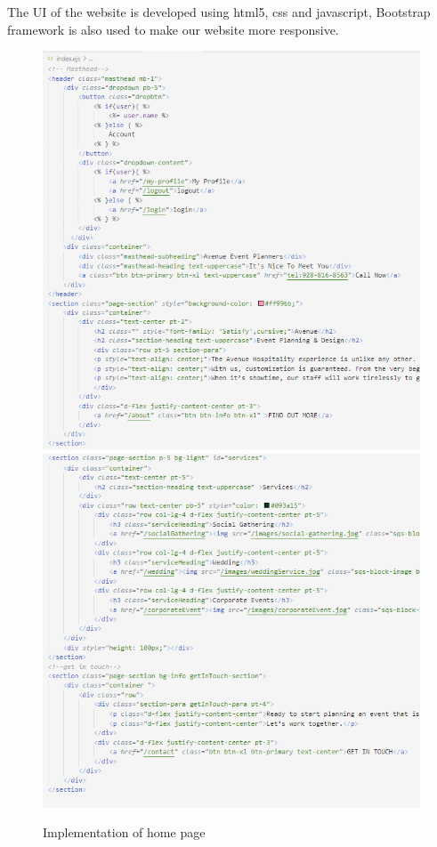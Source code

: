 \hspace{.2cm} 
The UI of the website is developed using html5, css and javascript, Bootstrap framework is also used to make our website more responsive.

\begin{figure}[h]
	\centering
	\includegraphics[scale=0.5]{homecode1.png}
	\includegraphics[scale=0.5]{homecode2.png}
	\caption{Implementation of home page}
	\label{Implementation of home page}
\end{figure}

